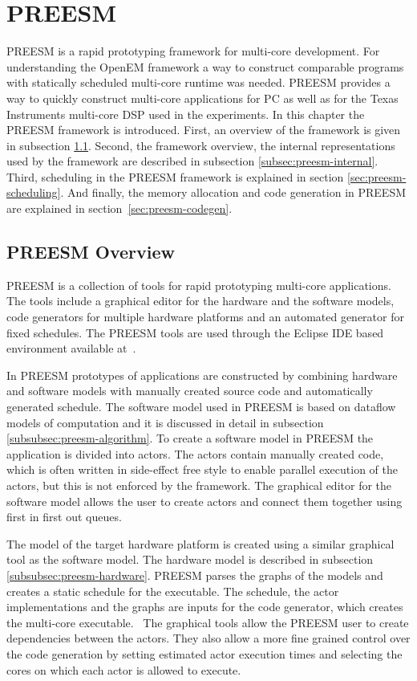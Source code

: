 \section{PREESM}
\label{sec:preesm}
PREESM is a rapid prototyping framework for multi-core development. For understanding the OpenEM framework a way to construct comparable programs with statically scheduled multi-core runtime was needed. PREESM provides a way to quickly construct multi-core applications for PC as well as for the Texas Instruments multi-core DSP used in the experiments. In this chapter the PREESM framework is introduced. First, an overview of the framework is given in subsection \ref{subsec:preesm-overview}. Second, the framework overview, the internal representations used by the framework are described in subsection \ref{subsec:preesm-internal}. Third, scheduling in the PREESM framework is explained in section \ref{sec:preesm-scheduling}. And finally, the memory allocation and code generation in PREESM are explained in section~\ref{sec:preesm-codegen}.

\subsection{PREESM Overview}
\label{subsec:preesm-overview}
PREESM is a collection of tools for rapid prototyping multi-core applications. The tools include a graphical editor for the hardware and the software models, code generators for multiple hardware platforms and an automated generator for fixed schedules. The PREESM tools are used through the Eclipse IDE based environment available at~\cite{preesm}.

In PREESM prototypes of applications are constructed by combining hardware and software models with manually created source code and automatically generated schedule. The software model used in PREESM is based on dataflow models of computation and it is discussed in detail in subsection \ref{subsubsec:preesm-algorithm}. To create a software model in PREESM the application is divided into actors. The actors contain manually created code, which is often written in side-effect free style to enable parallel execution of the actors, but this is not enforced by the framework. The graphical editor for the software model allows the user to create actors and connect them together using first in first out queues.~\cite{preesm}

The model of the target hardware platform is created using a similar graphical tool as the software model. The hardware model is described in subsection \ref{subsubsec:preesm-hardware}. PREESM parses the graphs of the models and creates a static schedule for the executable. The schedule, the actor implementations and the graphs are inputs for the code generator, which creates the multi-core executable.~\cite{pelcat2014preesm} The graphical tools allow the PREESM user to create dependencies between the actors. They also allow a more fine grained control over the code generation by setting estimated actor execution times and selecting the cores on which each actor is allowed to execute.

